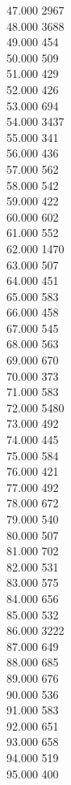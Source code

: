 { 47.000	2967 \\
 48.000	3688 \\
 49.000	454 \\
 50.000	509 \\
 51.000	429 \\
 52.000	426 \\
 53.000	694 \\
 54.000	3437 \\
 55.000	341 \\
 56.000	436 \\
 57.000	562 \\
 58.000	542 \\
 59.000	422 \\
 60.000	602 \\
 61.000	552 \\
 62.000	1470 \\
 63.000	507 \\
 64.000	451 \\
 65.000	583 \\
 66.000	458 \\
 67.000	545 \\
 68.000	563 \\
 69.000	670 \\
 70.000	373 \\
 71.000	583 \\
 72.000	5480 \\
 73.000	492 \\
 74.000	445 \\
 75.000	584 \\
 76.000	421 \\
 77.000	492 \\
 78.000	672 \\
 79.000	540 \\
 80.000	507 \\
 81.000	702 \\
 82.000	531 \\
 83.000	575 \\
 84.000	656 \\
 85.000	532 \\
 86.000	3222 \\
 87.000	649 \\
 88.000	685 \\
 89.000	676 \\
 90.000	536 \\
 91.000	583 \\
 92.000	651 \\
 93.000	658 \\
 94.000	519 \\
 95.000	400 \\
}
